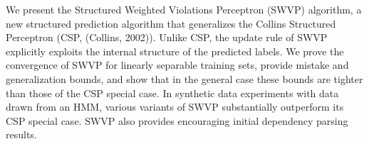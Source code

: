 We present the Structured Weighted Violations Perceptron (SWVP) algorithm, a new structured prediction algorithm that generalizes the Collins Structured Perceptron (CSP, (Collins, 2002)). Unlike CSP, the update rule of SWVP explicitly exploits the internal structure of the predicted labels. We prove the convergence of SWVP for linearly separable training sets, provide mistake and generalization bounds, and show that in the general case these bounds are tighter than those of the CSP special case. In synthetic data experiments with data drawn from an HMM, various variants of SWVP substantially outperform its CSP special case. SWVP also provides encouraging initial dependency parsing results.
